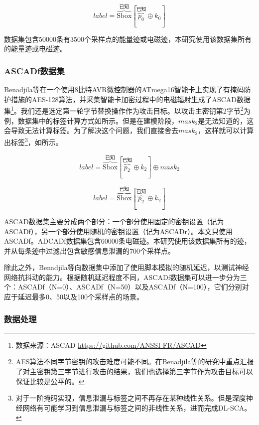 {	\begin{equation}\label{eq:aesrdmodel}
		label=\overbrace{\mathrm{Sbox}}^{\mbox{已知}}[\overbrace{p_0}^{\mbox{已知}}\oplus k_0]
	\end{equation}
	
	数据集包含50000条有3500个采样点的能量迹或电磁迹，本研究使用该数据集所有的能量迹或电磁迹。
	\subsubsection{ASCADf数据集}
	Benadjila等\citep{Benadjila20}在一个使用8比特AVR微控制器的ATmega16智能卡上实现了有掩码防护措施的AES-128算法，并采集智能卡加密过程中的电磁辐射生成了ASCAD数据集\footnote{数据来源：ASCAD \href{https://github.com/ANSSI-FR/ASCAD}{https://github.com/ANSSI-FR/ASCAD}}。我们还是选定第一轮字节替换操作作为攻击目标。以攻击主密钥第2字节\footnote{AES算法不同字节密钥的攻击难度可能不同。在Benadjila等的研究中重点汇报了对主密钥第三字节进行攻击的结果，我们也选择第三字节作为攻击目标可以保证比较是公平的。}为例，数据集中的标签计算方式如所示。但是在建模阶段，$mask_2$是无法知道的，这会导致无法计算标签。为了解决这个问题，我们直接舍去$mask_2$，这样就可以计算出标签\footnote{对于一阶掩码实现，信息泄漏与标签之间不再存在某种线性关系。但是深度神经网络有可能学习到信息泄漏与标签之间的非线性关系，进而完成DL-SCA。}，如所示。
	
	\begin{equation}\label{eq:ascadbadmodel}
		label=\overbrace{\mathrm{Sbox}}^{\mbox{已知}}[\overbrace{p_2}^{\mbox{已知}}\oplus k_2]\oplus mask_2
	\end{equation}
	
	\begin{equation}\label{eq:ascadmodel}
		label=\overbrace{\mathrm{Sbox}}^{\mbox{已知}}[\overbrace{p_2}^{\mbox{已知}}\oplus k_2]
	\end{equation}
	
	ASCAD数据集主要分成两个部分：一个部分使用固定的密钥设置（记为ASCADf），另一个部分使用随机的密钥设置（记为ASCADr）。本文只使用ASCADf。ADCADf数据集包含60000条电磁迹。本研究使用该数据集所有的迹，并从每条迹中过滤出包含敏感信息泄漏的700个采样点。
	
	除此之外，Benadjila等向数据集中添加了使用脚本模拟的随机延迟，以测试神经网络抗抖动的能力。根据随机延迟程度不同，ASCADf数据集可以进一步分为三个：ASCADf（N=0）、ASCADf（N=50）以及ASCADf（N=100），它们分别对应于延迟最多0、50以及100个采样点的场景。
	
	\subsubsection{数据处理}
	
}
